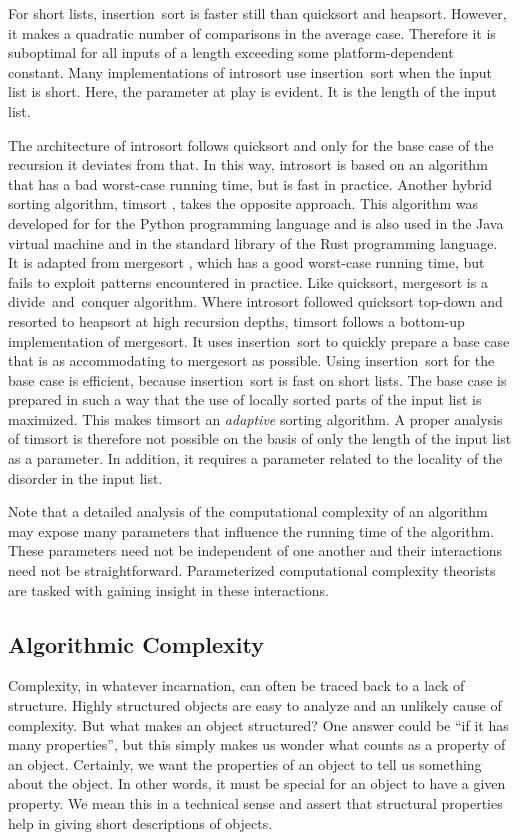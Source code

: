 \begin{example}
  For short lists, insertion~sort \parencite{cormen2009introduction} is faster still than quicksort and heapsort.
  However, it makes a quadratic number of comparisons in the average case.
  Therefore it is suboptimal for all inputs of a length exceeding some platform-dependent constant.
  Many implementations of introsort use insertion~sort when the input list is short.
  Here, the parameter at play is evident.
  It is the length of the input list.

  The architecture of introsort follows quicksort and only for the base case of the recursion it deviates from that.
  In this way, introsort is based on an algorithm that has a bad worst-case running time, but is  fast in practice.
  Another hybrid sorting algorithm, timsort \parencite{peters:timsort}, takes the opposite approach.
  This algorithm was developed for for the Python programming language and is also used in the Java virtual machine and in the standard library of the Rust programming language.
  It is adapted from mergesort \parencite{cormen2009introduction}, which has a good worst-case running time, but fails to exploit patterns encountered in practice.
  Like quicksort, mergesort is a divide~and~conquer algorithm.
  Where introsort followed quicksort top-down and resorted to heapsort at high recursion depths, timsort follows a bottom-up implementation of mergesort.
  It uses insertion~sort to quickly prepare a base case that is as accommodating to mergesort as possible.
  Using insertion~sort for the base case is efficient, because insertion~sort is fast on short lists.
  The base case is prepared in such a way that the use of locally sorted parts of the input list is maximized.
  This makes timsort an \emph{adaptive} sorting algorithm.
  A proper analysis of timsort is therefore not possible on the basis of only the length of the input list as a parameter.
  In addition, it requires a parameter related to the locality of the disorder in the input list.
\end{example}

Note that a detailed analysis of the computational complexity of an algorithm may expose many parameters that influence the running time of the algorithm.
These parameters need not be independent of one another and their interactions need not be straightforward.
Parameterized computational complexity theorists are tasked with gaining insight in these interactions.

\subsection{Algorithmic Complexity}
Complexity, in whatever incarnation, can often be traced back to a lack of structure.
Highly structured objects are easy to analyze and an unlikely cause of complexity.
But what makes an object structured?
One answer could be \enquote{if it has many properties}, but this simply makes us wonder what counts as a property of an object.
Certainly, we want the properties of an object to tell us something about the object.
In other words, it must be special for an object to have a given property.
We mean this in a technical sense and assert that structural properties help in giving short descriptions of objects.

